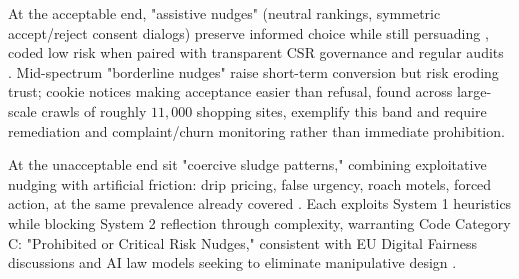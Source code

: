 \documentclass[11pt]{article}
\begin{document}
At the acceptable end, "assistive nudges" (neutral rankings, symmetric accept/reject consent dialogs) preserve informed choice while still persuading \parencites[33]{6087241}, coded low risk when paired with transparent CSR governance and regular audits \parencites[16]{8200246}. Mid-spectrum "borderline nudges" raise short-term conversion but risk eroding trust; cookie notices making acceptance easier than refusal, found across large-scale crawls of roughly $11{,}000$ shopping sites, exemplify this band \parencites[33]{6087241} and require remediation and complaint/churn monitoring rather than immediate prohibition.

At the unacceptable end sit "coercive sludge patterns," combining exploitative nudging with artificial friction: drip pricing, false urgency, roach motels, forced action, at the same prevalence already covered \parencites[7]{6295677}[4]{6295677}. Each exploits System 1 heuristics while blocking System 2 reflection through complexity, warranting Code Category C: "Prohibited or Critical Risk Nudges," consistent with EU Digital Fairness discussions and AI law models seeking to eliminate manipulative design \parencites[390]{7896734}[61--62]{2977039}.
\end{document}
